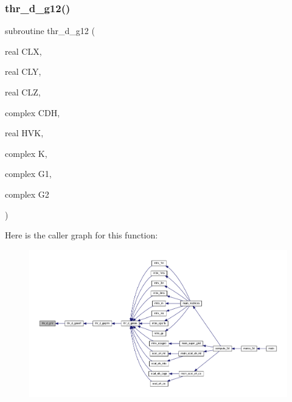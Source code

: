 \subsubsection{\texorpdfstring{thr\+\_\+d\+\_\+g12()}{thr\_d\_g12()}}
{\footnotesize\ttfamily subroutine thr\+\_\+d\+\_\+g12 (\begin{DoxyParamCaption}\item[{real}]{C\+LX,  }\item[{real}]{C\+LY,  }\item[{real}]{C\+LZ,  }\item[{complex}]{C\+DH,  }\item[{real}]{H\+VK,  }\item[{complex}]{K,  }\item[{complex}]{G1,  }\item[{complex}]{G2 }\end{DoxyParamCaption})}

Here is the caller graph for this function\+:
\nopagebreak
\begin{figure}[H]
\begin{center}
\leavevmode
\includegraphics[width=350pt]{Marco_8f90_a64bc8866e9fffd5b13a9903edf4aab07_icgraph}
\end{center}
\end{figure}
\mbox{\label{Marco_8f90_ae3cfe96a70c91f9cc48038b03b2dbd9b}} 
